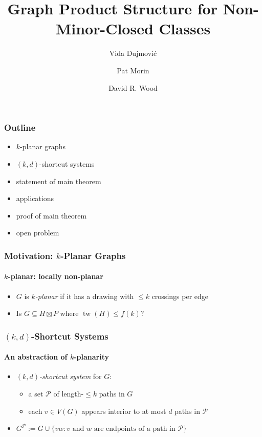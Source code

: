 \documentclass[xcolor=dvipsnames]{beamer}
\title{Graph Product Structure for Non-Minor-Closed Classes}
\author{Vida Dujmović \and Pat Morin \and David R. Wood}
\DeclareMathOperator{\tw}{tw}
\begin{document}
\begin{frame}
  \titlepage
\end{frame}

\begin{frame}
    \frametitle{Outline}

    \begin{itemize}
        \item $k$-planar graphs
        \item $(k,d)$-shortcut systems
        \item statement of main theorem
        \item applications
        \item proof of main theorem
        \item open problem
    \end{itemize}
\end{frame}

\begin{frame}
    \frametitle{Motivation: $k$-Planar Graphs}
    \framesubtitle{$k$-planar: locally non-planar}

    \begin{itemize}
        \item $G$ is \emph{$k$-planar} if it has a drawing with $\le\!\! k$ crossings per edge
        \begin{center}
        \end{center}
        \item<4-> Is $G\subseteq H\boxtimes P$ where $\tw(H)\le f(k)$?
    \end{itemize}
\end{frame}

\begin{frame}
    \frametitle{$(k,d)$-Shortcut Systems}
    \framesubtitle{An abstraction of $k$-planarity}

    \begin{itemize}
        \item \emph{$(k,d)$-shortcut system} for $G$:
        \begin{itemize}
            \item<2-> a set $\mathcal{P}$ of length-$\le\!\! k$ paths in $G$
            \item<2-> each $v\in V(G)$ appears interior to at most $d$ paths in $\mathcal{P}$
        \end{itemize}
    \end{itemize}
    \begin{center}
    \end{center}
    \begin{itemize}
        \item<3-> $G^{\mathcal{P}}:= G\cup\{vw:\mbox{$v$ and $w$ are endpoints of a path in $\mathcal{P}$}\}$
    \end{itemize}
\end{frame}
\end{document}
